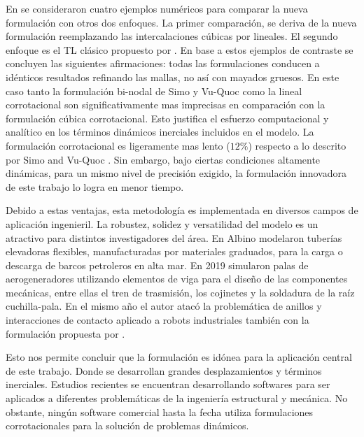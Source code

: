 En \cite{Le2014} se consideraron cuatro ejemplos numéricos para comparar la nueva formulación con otros dos enfoques. La primer comparación, se deriva de la nueva formulación reemplazando las intercalaciones cúbicas por lineales. El segundo enfoque es el TL clásico propuesto por \cite{simo1988dynamics}. En base a estos ejemplos de contraste se concluyen las siguientes afirmaciones: todas las formulaciones conducen a idénticos resultados refinando las mallas, no así con mayados gruesos. En este caso tanto la formulación bi-nodal de Simo y Vu-Quoc como la lineal corrotacional son significativamente mas imprecisas en comparación con la formulación cúbica corrotacional. Esto justifica el esfuerzo computacional y analítico en los términos dinámicos inerciales incluidos en el modelo. La formulación corrotacional es ligeramente mas lento ($12\%$) respecto a lo descrito por Simo and Vu-Quoc . Sin embargo, bajo ciertas condiciones altamente dinámicas, para un mismo nivel de precisión exigido, la formulación innovadora de este trabajo lo logra en menor tiempo.  

Debido a estas ventajas, esta metodología es implementada en diversos campos de aplicación ingenieril. La robustez, solidez y versatilidad del modelo es un atractivo para distintos investigadores del área. En \cite{albino2018co} Albino modelaron tuberías elevadoras flexibles, manufacturadas por materiales graduados,  para la carga o descarga de barcos petroleros en alta mar. En 2019 \cite{asadi2019multibody} simularon palas de aerogeneradores utilizando elementos de viga para el diseño de las componentes mecánicas, entre ellas el tren de trasmisión, los cojinetes y la soldadura de la raíz cuchilla-pala. En el mismo año el autor \cite{barzanooni2018modeling} atacó la problemática de anillos y interacciones de contacto aplicado a robots industriales también con la formulación propuesta por \cite{Le2014}.

Esto nos permite concluir que la formulación es idónea para la aplicación central de este trabajo. Donde se desarrollan grandes desplazamientos y términos inerciales. Estudios recientes se encuentran desarrollando softwares para ser aplicados a diferentes problemáticas de la ingeniería estructural y mecánica. No obstante, ningún software comercial hasta la fecha utiliza formulaciones corrotacionales para la solución de problemas dinámicos. 

